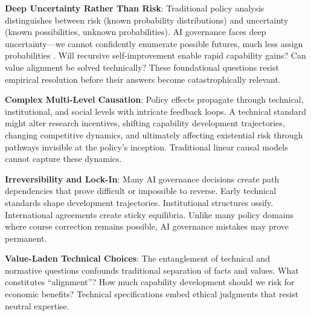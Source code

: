 \documentclass[
  11pt,
  letterpaper,
]{book}
\begin{document}
\textbf{Deep Uncertainty Rather Than Risk}: Traditional policy analysis
distinguishes between risk (known probability distributions) and
uncertainty (known possibilities, unknown probabilities). AI governance
faces deep uncertainty---we cannot confidently enumerate possible
futures, much less assign probabilities \textcite{hallegatte2012}. Will
recursive self-improvement enable rapid capability gains? Can value
alignment be solved technically? These foundational questions resist
empirical resolution before their answers become catastrophically
relevant.

\textbf{Complex Multi-Level Causation}: Policy effects propagate through
technical, institutional, and social levels with intricate feedback
loops. A technical standard might alter research incentives, shifting
capability development trajectories, changing competitive dynamics, and
ultimately affecting existential risk through pathways invisible at the
policy's inception. Traditional linear causal models cannot capture
these dynamics.

\textbf{Irreversibility and Lock-In}: Many AI governance decisions
create path dependencies that prove difficult or impossible to reverse.
Early technical standards shape development trajectories. Institutional
structures ossify. International agreements create sticky equilibria.
Unlike many policy domains where course correction remains possible, AI
governance mistakes may prove permanent.

\textbf{Value-Laden Technical Choices}: The entanglement of technical
and normative questions confounds traditional separation of facts and
values. What constitutes ``alignment''? How much capability development
should we risk for economic benefits? Technical specifications embed
ethical judgments that resist neutral expertise.
\end{document}
